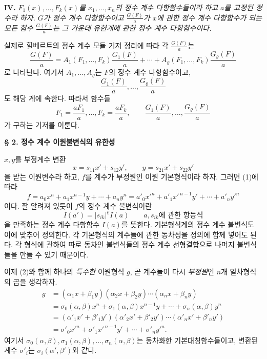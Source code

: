 \textbf{IV.} \emph{\(F_1(x),\ldots,F_k(x)\)를 \(x_1,\ldots,x_n\)의 정수 계수 다항함수들이라 하고 \(a\)를 고정된 정수라 하자. \(G\)가 정수 계수 다항함수이고 \(\frac{G(F)}a\)가 \(x\)에 관한 정수 계수 다항함수가 되는 모든 함수 \(\frac{G(F)}a\)는 그 가운데 유한개에 관한 정수 계수 다항함수이다.}

실제로 힐베르트의 정수 계수 모듈 기저 정리에 따라 각 \(\frac{G(F)}a\)는
\[
\frac{G(F)}a=
A_1(F_1,\ldots,F_k)\frac{G_1(F)}a+\cdots+
A_\varrho(F_1,\ldots,F_k)\frac{G_\varrho(F)}a
\]
로 나타난다. 여기서 \(A_1,\ldots,A_\varrho\)는 \(F\)의 정수 계수 다항함수이고,
\[
\frac{G_1(F)}a,\ldots,\frac{G_\varrho(F)}a
\]
도 해당 계에 속한다. 따라서 함수들
\[
F_1=\frac{aF_1}{a},\ldots,F_k=\frac{aF_k}{a},
\qquad
\frac{G_1(F)}a,\ldots,\frac{G_\varrho(F)}a
\]
가 구하는 기저를 이룬다.

\begin{center}
\textbf{§ 2. 정수 계수 이원불변식의 유한성}
\end{center}

\(x,y\)를 부정계수 변환
\begin{equation}
\tag{1}
x=s_{11}x'+s_{12}y',\qquad y=s_{21}x'+s_{22}y'
\end{equation}
을 받는 이원변수라 하고, \(f\)를 계수가 부정원인 이원 기본형식이라 하자. 그러면 (1)에 따라
\begin{equation}
\tag{2}
f=a_0x^n+a_1x^{n-1}y+\cdots+a_ny^n
=a'_0x'^n+a'_1x'^{\,n-1}y'+\cdots+a'_ny'^n
\end{equation}
이다. 잘 알려져 있듯이 \(f\)의 정수 계수 불변식이란
\begin{equation}
\tag{3}
I(a')=|s_{ik}|^\varrho I(a)
\qquad\text{\(a,s_{ik}\)에 관한 항등식}
\end{equation}
을 만족하는 정수 계수 다항함수 \(I(a)\)를 뜻한다. 기본형식계의 정수 계수 불변식도 이에 맞추어 정의한다. 각 기본형식의 계수들에 관한 동차성을 정의에 함께 넣어도 된다. 각 형식에 관하여 따로 동차인 불변식들의 정수 계수 선형결합으로 나머지 불변식들을 만들 수 있기 때문이다.

이제 (2)와 함께 하나의 \emph{특수한} 이원형식 \(g\), 곧 계수들이 다시 \emph{부정원}인 \(n\)개 일차형식의 곱을 생각하자.
\begin{equation}
\tag{4}
\begin{aligned}
g&=(\alpha_1x+\beta_1y)(\alpha_2x+\beta_2y)\cdots(\alpha_nx+\beta_ny)\\
 &=\sigma_0(\alpha,\beta)x^n+\sigma_1(\alpha,\beta)x^{n-1}y+\cdots+\sigma_n(\alpha,\beta)y^n\\
 &=(\alpha'_1x'+\beta'_1y')(\alpha'_2x'+\beta'_2y')\cdots(\alpha'_nx'+\beta'_ny')\\
 &=\sigma'_0x'^n+\sigma'_1x'^{\,n-1}y'+\cdots+\sigma'_ny'^n.
\end{aligned}
\end{equation}
여기서 \(\sigma_0(\alpha,\beta),\sigma_1(\alpha,\beta),\ldots,\sigma_n(\alpha,\beta)\)는 동차화한 기본대칭함수들이고, 변환된 계수 \(\sigma'_i\)는 \(\sigma_i(\alpha',\beta')\)와 같다.

